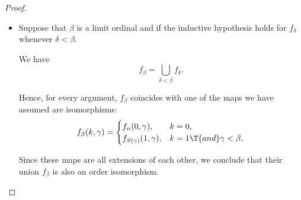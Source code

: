 \begin{proof}
\begin{itemize}
    Therefore, since \( f_\delta \) is an isomorphism, \( f_\beta \) also is.

    \item Suppose that \( \beta \) is a limit ordinal and if the inductive hypothesis holds for \( f_\delta \) whenever \( \delta < \beta \).

    We have
    \begin{equation*}
      f_\beta = \bigcup_{\delta < \beta} f_\delta.
    \end{equation*}

    Hence, for every argument, \( f_\beta \) coincides with one of the maps we have assumed are isomorphisms:
    \begin{equation*}
      f_\beta(k, \gamma) = \begin{cases}
        f_\alpha(0, \gamma),            &k = 0, \\
        f_{S(\gamma)}(1, \gamma), &k = 1 \T{and} \gamma < \beta,
      \end{cases}
    \end{equation*}

    Since these maps are all extensions of each other, we conclude that their union \( f_\beta \) is also an order isomorphism.
  \end{itemize}
\end{proof}

